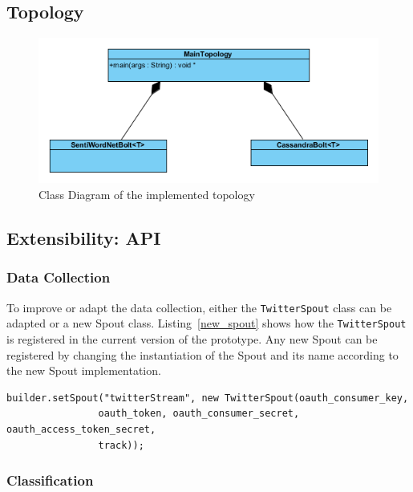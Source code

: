 \documentclass[a4paper]{article}
\begin{document}
\subsection{Topology}\label{section_topology}
\begin{figure}[h]
	\centering
	\includegraphics{images/uml_topology.png}
	\caption{Class Diagram of the implemented topology}
	\label{uml_topology}
\end{figure}

\subsection{Extensibility: API}\label{section_api}
\subsubsection{Data Collection}
To improve or adapt the data collection, either the \texttt{TwitterSpout} class can be adapted or a new Spout class. Listing~\ref{new_spout} shows how the \texttt{TwitterSpout} is registered in the current version of the prototype. Any new Spout can be registered by changing the instantiation of the Spout and its name according to the new Spout implementation.
\begin{lstlisting}
builder.setSpout("twitterStream", new TwitterSpout(oauth_consumer_key,
				oauth_token, oauth_consumer_secret, oauth_access_token_secret,
				track));
\end{lstlisting}
\subsubsection{Classification}
\end{document}
